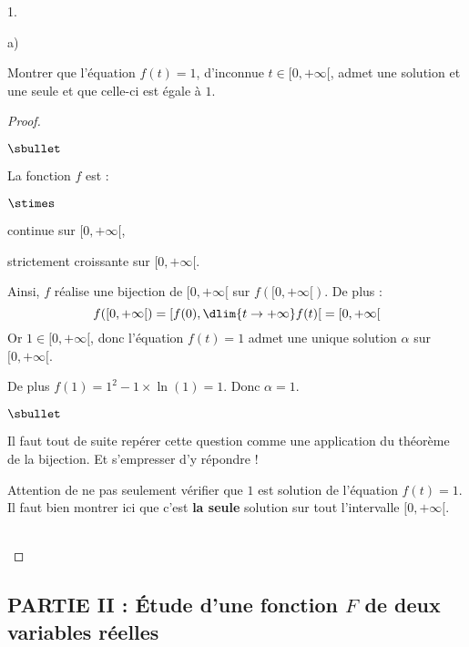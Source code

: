 \documentclass[11pt]{article}%
\begin{document}
\begin{noliste}{1.}
\begin{noliste}{a)}
\end{noliste}

\item Montrer que l'équation $f(t)=1$, d'inconnue $t\in[0,+\infty[$, 
admet une solution et une seule et que celle-ci est égale à $1$.

\begin{proof}~%
  \begin{noliste}{$\sbullet$}
  \item La fonction $f$ est :
    \begin{noliste}{$\stimes$}
    \item continue sur $[0,+\infty[$,
    \item strictement croissante sur $[0,+\infty[$.
    \end{noliste}
    Ainsi, $f$ réalise une bijection de $[0,+\infty[$ sur
    $f([0,+\infty[)$. De plus :
    \[
    f([0,+\infty[) = \left[f(0), \dlim{t\to+\infty} f(t)\right[
    =[0,+\infty[
    \]
    Or $1\in [0, +\infty[$, donc l'équation $f(t)=1$ admet une unique
    solution $\alpha$ sur $[0,+\infty[$.
    
  \item De plus $f(1)=1^2-1\times \ln(1)=1$. Donc $\alpha=1$.
  \end{noliste}
  \conc{L'équation $f(t)=1$ admet $1$ comme unique solution sur
    $[0,+\infty[$.}
  \begin{remark}
    \begin{noliste}{$\sbullet$}
    \item Il faut tout de suite repérer cette question comme une
      application du théorème de la bijection. Et s'empresser d'y
      répondre !
      
    \item Attention de ne pas seulement vérifier que $1$ est solution
      de l'équation $f(t)=1$.\\
      Il faut bien montrer ici que c'est {\bf la seule} solution sur
      tout l'intervalle $[0,+\infty[$.
    \end{noliste}
  \end{remark}~\\[-1.4cm]
\end{proof}

\end{noliste}


\newpage


\subsection*{PARTIE II : Étude d'une fonction $F$ de deux 
variables réelles}
\end{document}
